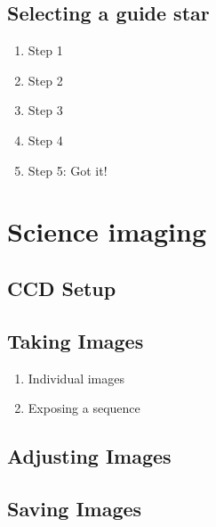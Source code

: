 \documentclass[12pt,twoside,a4paper]{report}
\begin{document}
\subsection{Selecting a guide star}
\begin{enumerate}
 \item Step 1
 \item Step 2
 \item Step 3
 \item Step 4
 \item Step 5: Got it!
\end{enumerate}




\vfill \eject 

\section{Science imaging}

\subsection{CCD Setup}

\subsection{Taking Images}
\label{taking_images}

\begin{enumerate}
 \item Individual images
 \item Exposing a sequence
\end{enumerate}

\subsection{Adjusting Images}

\subsection{Saving Images}
\end{document}
